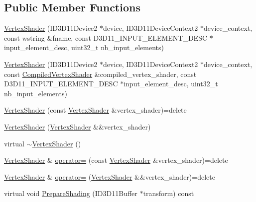\subsection*{Public Member Functions}
\begin{DoxyCompactItemize}
\item 
\hyperlink{classmage_1_1_vertex_shader_ae1cae27fde45f87829330474d13a579f}{Vertex\+Shader} (I\+D3\+D11\+Device2 $\ast$device, I\+D3\+D11\+Device\+Context2 $\ast$device\+\_\+context, const wstring \&fname, const D3\+D11\+\_\+\+I\+N\+P\+U\+T\+\_\+\+E\+L\+E\+M\+E\+N\+T\+\_\+\+D\+E\+SC $\ast$input\+\_\+element\+\_\+desc, uint32\+\_\+t nb\+\_\+input\+\_\+elements)
\item 
\hyperlink{classmage_1_1_vertex_shader_a0d649afa3b4b458b956630f010413536}{Vertex\+Shader} (I\+D3\+D11\+Device2 $\ast$device, I\+D3\+D11\+Device\+Context2 $\ast$device\+\_\+context, const \hyperlink{structmage_1_1_compiled_vertex_shader}{Compiled\+Vertex\+Shader} \&compiled\+\_\+vertex\+\_\+shader, const D3\+D11\+\_\+\+I\+N\+P\+U\+T\+\_\+\+E\+L\+E\+M\+E\+N\+T\+\_\+\+D\+E\+SC $\ast$input\+\_\+element\+\_\+desc, uint32\+\_\+t nb\+\_\+input\+\_\+elements)
\item 
\hyperlink{classmage_1_1_vertex_shader_a713f8581278ea2e5eb3010207b7e42a8}{Vertex\+Shader} (const \hyperlink{classmage_1_1_vertex_shader}{Vertex\+Shader} \&vertex\+\_\+shader)=delete
\item 
\hyperlink{classmage_1_1_vertex_shader_adb9497fa9e712c3b7c94d377408c24f3}{Vertex\+Shader} (\hyperlink{classmage_1_1_vertex_shader}{Vertex\+Shader} \&\&vertex\+\_\+shader)
\item 
virtual \hyperlink{classmage_1_1_vertex_shader_aa475ad31613dd20fdcc4930409fd0cfd}{$\sim$\+Vertex\+Shader} ()
\item 
\hyperlink{classmage_1_1_vertex_shader}{Vertex\+Shader} \& \hyperlink{classmage_1_1_vertex_shader_a0094f5c2adb8377fa5c8d52e7a65136f}{operator=} (const \hyperlink{classmage_1_1_vertex_shader}{Vertex\+Shader} \&vertex\+\_\+shader)=delete
\item 
\hyperlink{classmage_1_1_vertex_shader}{Vertex\+Shader} \& \hyperlink{classmage_1_1_vertex_shader_ada6250a89610e5649e0062c9a50fb78a}{operator=} (\hyperlink{classmage_1_1_vertex_shader}{Vertex\+Shader} \&\&vertex\+\_\+shader)=delete
\item 
virtual void \hyperlink{classmage_1_1_vertex_shader_a53f4b25241f6c5739724d421c9f29a36}{Prepare\+Shading} (I\+D3\+D11\+Buffer $\ast$transform) const
\end{DoxyCompactItemize}
